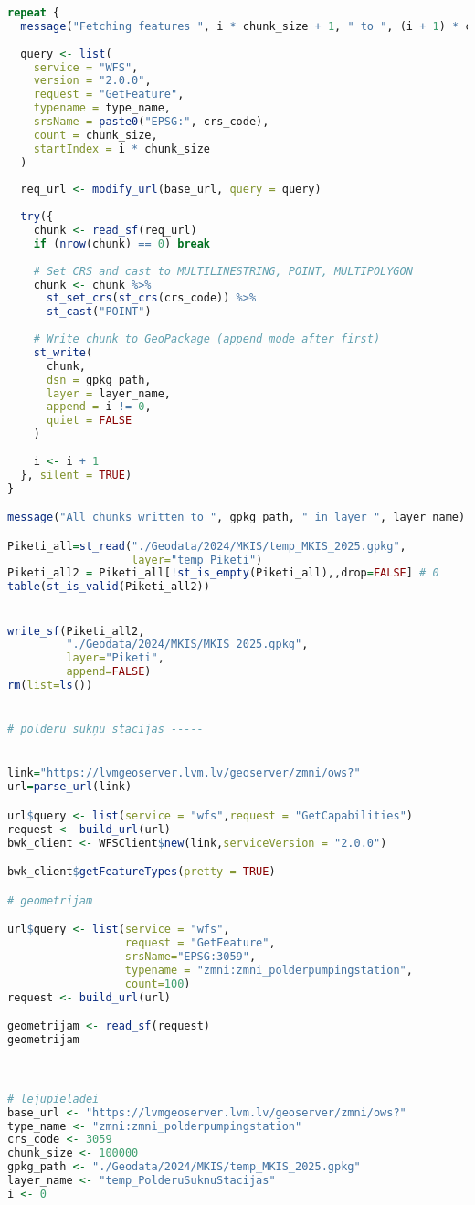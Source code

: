 \documentclass[
]{book}
\begin{document}
\begin{lstlisting}[language=R]
repeat {
  message("Fetching features ", i * chunk_size + 1, " to ", (i + 1) * chunk_size, "...")
  
  query <- list(
    service = "WFS",
    version = "2.0.0",
    request = "GetFeature",
    typename = type_name,
    srsName = paste0("EPSG:", crs_code),
    count = chunk_size,
    startIndex = i * chunk_size
  )
  
  req_url <- modify_url(base_url, query = query)
  
  try({
    chunk <- read_sf(req_url)
    if (nrow(chunk) == 0) break
    
    # Set CRS and cast to MULTILINESTRING, POINT, MULTIPOLYGON
    chunk <- chunk %>%
      st_set_crs(st_crs(crs_code)) %>%
      st_cast("POINT")
    
    # Write chunk to GeoPackage (append mode after first)
    st_write(
      chunk, 
      dsn = gpkg_path,
      layer = layer_name,
      append = i != 0,
      quiet = FALSE
    )
    
    i <- i + 1
  }, silent = TRUE)
}

message("All chunks written to ", gpkg_path, " in layer ", layer_name)

Piketi_all=st_read("./Geodata/2024/MKIS/temp_MKIS_2025.gpkg",
                   layer="temp_Piketi")
Piketi_all2 = Piketi_all[!st_is_empty(Piketi_all),,drop=FALSE] # 0
table(st_is_valid(Piketi_all2))


write_sf(Piketi_all2,
         "./Geodata/2024/MKIS/MKIS_2025.gpkg",
         layer="Piketi",
         append=FALSE)
rm(list=ls())


# polderu sūkņu stacijas -----


link="https://lvmgeoserver.lvm.lv/geoserver/zmni/ows?"
url=parse_url(link)

url$query <- list(service = "wfs",request = "GetCapabilities")
request <- build_url(url)
bwk_client <- WFSClient$new(link,serviceVersion = "2.0.0")

bwk_client$getFeatureTypes(pretty = TRUE)

# geometrijam

url$query <- list(service = "wfs",
                  request = "GetFeature",
                  srsName="EPSG:3059",
                  typename = "zmni:zmni_polderpumpingstation",
                  count=100)
request <- build_url(url)

geometrijam <- read_sf(request)
geometrijam



# lejupielādei
base_url <- "https://lvmgeoserver.lvm.lv/geoserver/zmni/ows?"
type_name <- "zmni:zmni_polderpumpingstation"
crs_code <- 3059
chunk_size <- 100000
gpkg_path <- "./Geodata/2024/MKIS/temp_MKIS_2025.gpkg"
layer_name <- "temp_PolderuSuknuStacijas"
i <- 0


\end{lstlisting}
\end{document}
